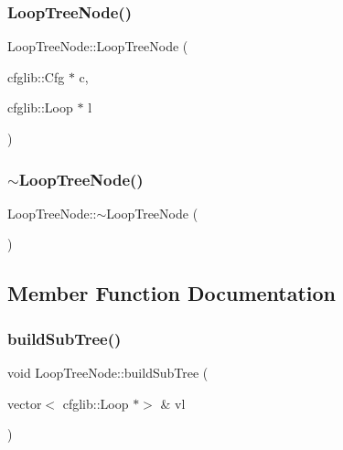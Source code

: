 \subsubsection{\texorpdfstring{Loop\+Tree\+Node()}{LoopTreeNode()}}
{\footnotesize\ttfamily Loop\+Tree\+Node\+::\+Loop\+Tree\+Node (\begin{DoxyParamCaption}\item[{cfglib\+::\+Cfg $\ast$}]{c,  }\item[{cfglib\+::\+Loop $\ast$}]{l }\end{DoxyParamCaption})}

\mbox{\label{classLoopTreeNode_a4fc6822a2464d24381991e002c2342cf}} 
\subsubsection{\texorpdfstring{$\sim$\+Loop\+Tree\+Node()}{~LoopTreeNode()}}
{\footnotesize\ttfamily Loop\+Tree\+Node\+::$\sim$\+Loop\+Tree\+Node (\begin{DoxyParamCaption}{ }\end{DoxyParamCaption})}



\subsection{Member Function Documentation}
\mbox{\label{classLoopTreeNode_a2c627285512cf63318c83ee13eaf9acc}} 
\subsubsection{\texorpdfstring{build\+Sub\+Tree()}{buildSubTree()}}
{\footnotesize\ttfamily void Loop\+Tree\+Node\+::build\+Sub\+Tree (\begin{DoxyParamCaption}\item[{vector$<$ cfglib\+::\+Loop $\ast$$>$ \&}]{vl }\end{DoxyParamCaption})}

\mbox{\label{classLoopTreeNode_a6675cdf0a28839ac371f69a944075e10}} 
